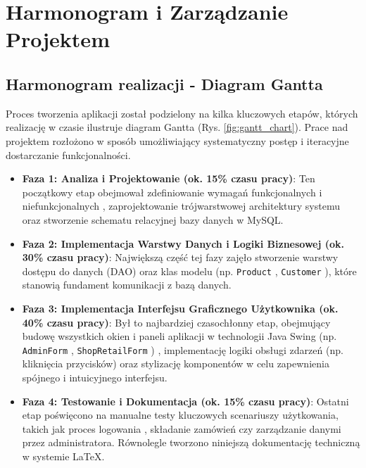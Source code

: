
\chapter{Harmonogram i Zarządzanie Projektem}
\label{chap:harmonogram}

\section{Harmonogram realizacji - Diagram Gantta}
\label{sec:gantt}

Proces tworzenia aplikacji został podzielony na kilka kluczowych etapów, których realizację w czasie ilustruje diagram Gantta (Rys. \ref{fig:gantt_chart}). Prace nad projektem rozłożono w sposób umożliwiający systematyczny postęp i iteracyjne dostarczanie funkcjonalności.

\begin{itemize}
    \item \textbf{Faza 1: Analiza i Projektowanie (ok. 15\% czasu pracy)}: Ten początkowy etap obejmował zdefiniowanie wymagań funkcjonalnych i niefunkcjonalnych , zaprojektowanie trójwarstwowej architektury systemu  oraz stworzenie schematu relacyjnej bazy danych w MySQL.
    
    \item \textbf{Faza 2: Implementacja Warstwy Danych i Logiki Biznesowej (ok. 30\% czasu pracy)}: Największą część tej fazy zajęło stworzenie warstwy dostępu do danych (DAO)  oraz klas modelu (np. \texttt{Product} , \texttt{Customer} ), które stanowią fundament komunikacji z bazą danych.
    
    \item \textbf{Faza 3: Implementacja Interfejsu Graficznego Użytkownika (ok. 40\% czasu pracy)}: Był to najbardziej czasochłonny etap, obejmujący budowę wszystkich okien i paneli aplikacji w technologii Java Swing (np. \texttt{AdminForm} , \texttt{ShopRetailForm} ) , implementację logiki obsługi zdarzeń (np. kliknięcia przycisków)  oraz stylizację komponentów w celu zapewnienia spójnego i intuicyjnego interfejsu.
    
    \item \textbf{Faza 4: Testowanie i Dokumentacja (ok. 15\% czasu pracy)}: Ostatni etap poświęcono na manualne testy kluczowych scenariuszy użytkowania, takich jak proces logowania , składanie zamówień  czy zarządzanie danymi przez administratora. Równolegle tworzono niniejszą dokumentację techniczną w systemie \LaTeX.
\end{itemize}

